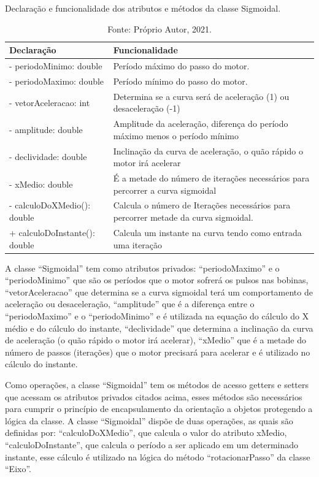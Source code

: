 \begin{table}[H]
    \footnotesize
    \centering
    \caption{Declaração e funcionalidade dos atributos e métodos da classe Sigmoidal.}
    \begin{tabular}{lp{9cm}}
        \hline
        \textbf{Declaração} & \textbf{Funcionalidade}\\
        \hline
        - periodoMinimo: double & Período máximo do passo do motor.\\
        - periodoMaximo: double & Período mínimo do passo do motor.\\
        - vetorAceleracao: int & Determina se a curva será de aceleração (1) ou desaceleração (-1)\\
        - amplitude: double & Amplitude da aceleração, diferença do período máximo menos o período mínimo\\
        - declividade: double & Inclinação da curva de aceleração, o quão rápido o motor irá acelerar\\
        - xMedio: double & É a metade do número de iterações necessários para percorrer a curva sigmoidal\\
        - calculoDoXMedio(): double & Calcula o número de Iterações necessários para percorrer metade da curva sigmoidal.\\
        + calculoDoInstante(): double & Calcula um instante na curva tendo como entrada uma iteração\\
        \hline       
    \end{tabular}
    \caption*{Fonte: Próprio Autor, 2021.}
    \label{tab:classesigmoidal}
\end{table}

A classe “Sigmoidal” tem como atributos privados: “periodoMaximo” e o “periodoMinimo” que são os períodos 
que o motor sofrerá os pulsos nas bobinas, “vetorAceleracao” que determina se a curva sigmoidal terá 
um comportamento de aceleração ou desaceleração, “amplitude” que é a diferença entre o “periodoMaximo” 
e o “periodoMinimo” e é utilizada na equação do cálculo do X médio e do cálculo do instante, “declividade” 
que determina a inclinação da curva de aceleração (o quão rápido o motor irá acelerar), “xMedio” que é a 
metade do número de passos (iterações) que o motor precisará para acelerar e é utilizado no cálculo 
do instante. 

Como operações, a classe “Sigmoidal” tem os métodos de acesso getters e setters que acessam os atributos 
privados citados acima, esses métodos são necessários para cumprir o princípio de encapsulamento da orientação 
a objetos protegendo a lógica da classe. A classe “Sigmoidal” dispõe de duas operações, as quais são definidas 
por: “calculoDoXMedio”, que calcula o valor do atributo xMedio, “calculoDoInstante”, que calcula o período a 
ser aplicado em um determinado instante, esse cálculo é utilizado na lógica do método “rotacionarPasso” 
da classe “Eixo”.

